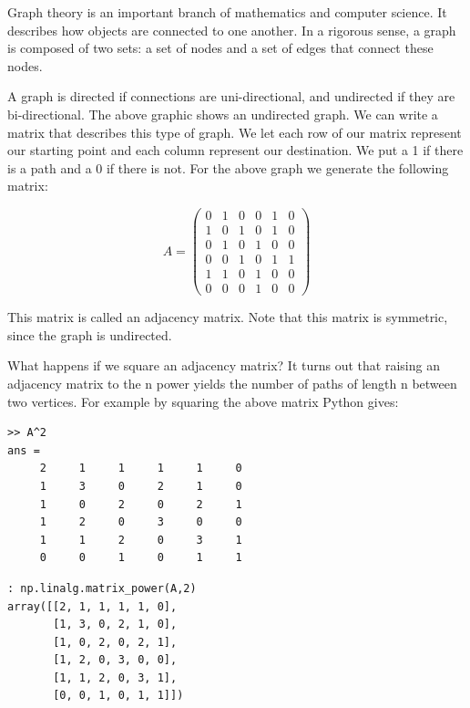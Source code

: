 Graph theory is an important branch of mathematics and computer science. It describes how objects are connected to one another. In a rigorous sense, a graph is composed of two sets: a set of nodes and a set of edges that connect these nodes. 

A graph is directed if connections are uni-directional, and undirected if they are bi-directional. The above graphic shows an undirected graph. We can write a matrix that describes this type of graph. We let each row of our matrix represent our starting point and each column represent our destination. We put a 1 if there is a path and a 0 if there is not. For the above graph we generate the following matrix:

\[
A = \begin{pmatrix}
0 & 1 & 0 & 0 & 1 & 0\\
1 & 0 & 1 & 0 & 1 & 0\\
0 & 1 & 0 & 1 & 0 & 0\\
0 & 0 & 1 & 0 & 1 & 1\\
1 & 1 & 0 & 1 & 0 & 0\\
0 & 0 & 0 & 1 & 0 & 0
\end{pmatrix}
\]

This matrix is called an adjacency matrix. Note that this matrix is symmetric, since the graph is undirected.

What happens if we square an adjacency matrix? It turns out that raising an adjacency matrix to the n power yields the number of paths of length n between two vertices. For example by squaring the above matrix Python gives:
\begin{matlab}
\begin{lstlisting}[style=matlab]
>> A^2
ans =
     2     1     1     1     1     0
     1     3     0     2     1     0
     1     0     2     0     2     1
     1     2     0     3     0     0
     1     1     2     0     3     1
     0     0     1     0     1     1
\end{lstlisting}
\end{matlab}
\begin{python}
\begin{lstlisting}[style=python]
: np.linalg.matrix_power(A,2)
array([[2, 1, 1, 1, 1, 0],
       [1, 3, 0, 2, 1, 0],
       [1, 0, 2, 0, 2, 1],
       [1, 2, 0, 3, 0, 0],
       [1, 1, 2, 0, 3, 1],
       [0, 0, 1, 0, 1, 1]])
\end{lstlisting}
\end{python}

